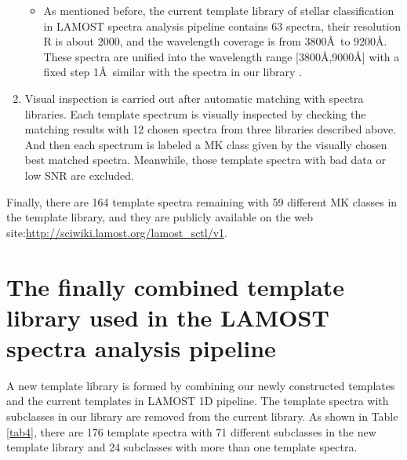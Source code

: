 \documentclass[manuscript]{aastex}
\begin{document}
\begin{enumerate}
\begin{itemize}
        \item As mentioned before, the current template library of stellar classification in LAMOST spectra analysis pipeline contains 63 spectra,
        their resolution R is about 2000, and the wavelength coverage is from 3800\AA\ to 9200\AA.
        These spectra are unified into the wavelength range [3800\AA,9000\AA] with a fixed step 1\AA\ similar with the spectra in our library .
    \end{itemize}

\item Visual inspection is carried out  after automatic  matching with spectra libraries.
Each template spectrum is visually inspected by checking the matching results with 12 chosen spectra from three libraries described above.
And then each spectrum is labeled a MK class given by the   visually chosen best matched spectra.
Meanwhile, those template spectra with bad data or low SNR are excluded.
\end{enumerate}

Finally,  there are 164 template spectra remaining with 59 different MK classes in the template library,
and they are publicly available on the web site:\url{http://sciwiki.lamost.org/lamost_sctl/v1}.

\section{The finally combined template library used in the LAMOST spectra analysis pipeline}

A new template library is formed by combining our newly constructed templates and the current templates in LAMOST 1D pipeline.
The template spectra with  subclasses in our library are removed from the current library.
As shown in Table \ref{tab4},
there are 176 template spectra with 71 different subclasses in the new template library and 24 subclasses with more than one template spectra.


\label{sect:Results}
\end{document}
